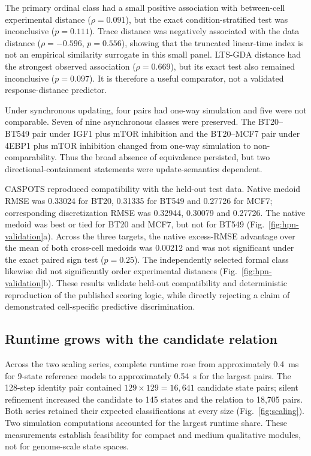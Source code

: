 \documentclass[pdflatex,sn-mathphys-ay]{sn-jnl}
\theoremstyle{definition}
\begin{document}
The primary ordinal class had a small positive association with between-cell
experimental distance ($\rho=0.091$), but the exact condition-stratified test was
inconclusive ($p=0.111$). Trace distance was negatively associated with the data
distance ($\rho=-0.596$, $p=0.556$), showing that the truncated linear-time index
is not an empirical similarity surrogate in this small panel. LTS-GDA distance
had the strongest observed association ($\rho=0.669$), but its exact test also
remained inconclusive ($p=0.097$). It is therefore a useful comparator, not a
validated response-distance predictor.

Under synchronous updating, four pairs had one-way simulation and five were not
comparable. Seven of nine asynchronous classes were preserved. The
BT20--BT549 pair under IGF1 plus mTOR inhibition and the BT20--MCF7 pair under
4EBP1 plus mTOR inhibition changed from one-way simulation to
non-comparability. Thus the broad absence of equivalence persisted, but two
directional-containment statements were update-semantics dependent.

CASPOTS reproduced compatibility with the held-out test data. Native medoid RMSE
was 0.33024 for BT20, 0.31335 for BT549 and 0.27726 for MCF7; corresponding
discretization RMSE was 0.32944, 0.30079 and 0.27726. The native medoid was best
or tied for BT20 and MCF7, but not for BT549 (Fig.~\ref{fig:hpn-validation}a).
Across the three targets, the native excess-RMSE advantage over the mean of both
cross-cell medoids was 0.00212 and was not significant under the exact paired
sign test ($p=0.25$). The independently selected formal class likewise did not
significantly order experimental distances (Fig.~\ref{fig:hpn-validation}b).
These results validate held-out compatibility and deterministic reproduction of
the published scoring logic, while directly rejecting a claim of demonstrated
cell-specific predictive discrimination.

\subsection{Runtime grows with the candidate relation}\label{sec:scaling-results}

Across the two scaling series, complete runtime rose from approximately
0.4~ms for 9-state reference models to approximately 0.54~s for the largest
pairs. The 128-step identity pair contained $129\times129=16{,}641$ candidate
state pairs; silent refinement increased the candidate to 145 states and the
relation to 18,705 pairs. Both series retained their expected classifications at
every size (Fig.~\ref{fig:scaling}). Two simulation computations accounted for
the largest runtime share. These measurements establish feasibility for compact
and medium qualitative modules, not for genome-scale state spaces.
\end{document}
